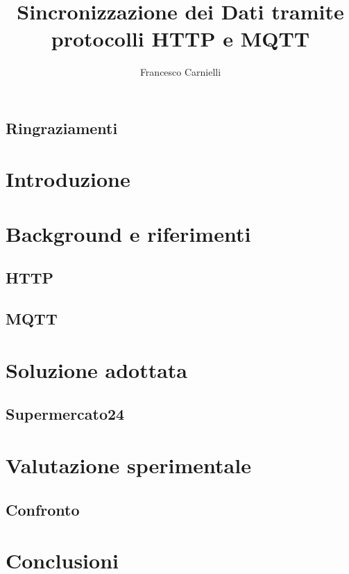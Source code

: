 \documentclass[a4paper, 12pt] {report}
\title{Sincronizzazione dei Dati tramite protocolli HTTP e MQTT}
\author{Francesco Carnielli}
\date{}
\begin{document}
\maketitle

\newpage
\thispagestyle{empty}
\mbox{}

\newpage
\thispagestyle{empty}
\mbox{}

\section*{Ringraziamenti}


\newpage
\thispagestyle{empty}
\mbox{}

\tableofcontents
\newpage

\clearpage
{}
\setcounter{page}{1}

\chapter{Introduzione}


\chapter{Background e riferimenti}

\section{HTTP}

\section{MQTT}


\chapter{Soluzione adottata}

\section{Supermercato24}


\chapter{Valutazione sperimentale}

\section{Confronto}


\chapter{Conclusioni}

\medskip

\newrefcontext[sorting=none]
\printbibliography[heading=bibintoc, title={Bibliografia}]
\end{document}
